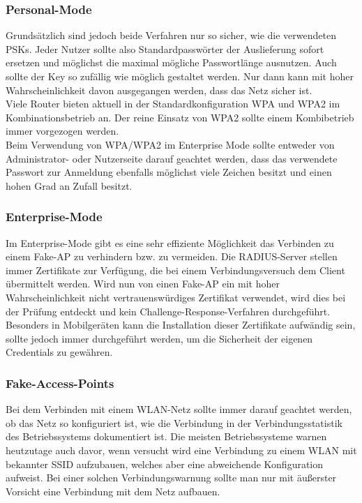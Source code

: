 \subsubsection{Personal-Mode}
Grundsätzlich sind jedoch beide Verfahren nur so sicher, wie die verwendeten PSKs. Jeder Nutzer sollte also Standardpasswörter der Auslieferung sofort ersetzen und möglichst die maximal mögliche Passwortlänge ausnutzen. Auch sollte der Key so zufällig wie möglich gestaltet werden. Nur dann kann mit hoher Wahrscheinlichkeit davon ausgegangen werden, dass das Netz sicher ist. \\
Viele Router bieten aktuell in der Standardkonfiguration WPA und WPA2 im Kombinationsbetrieb an. Der reine Einsatz von WPA2 sollte einem Kombibetrieb immer vorgezogen werden. \\
Beim Verwendung von WPA/WPA2 im Enterprise Mode sollte entweder von Administrator- oder Nutzerseite darauf geachtet werden, dass das verwendete Passwort zur Anmeldung ebenfalls möglichst viele Zeichen besitzt und einen hohen Grad an Zufall besitzt.
\subsubsection{Enterprise-Mode}
Im Enterprise-Mode gibt es eine sehr effiziente Möglichkeit das Verbinden zu einem Fake-AP zu verhindern bzw. zu vermeiden. Die RADIUS-Server stellen immer Zertifikate zur Verfügung, die bei einem Verbindungsversuch dem Client übermittelt werden. Wird nun von einen Fake-AP ein mit hoher Wahrscheinlichkeit nicht vertrauenswürdiges Zertifikat verwendet, wird dies bei der Prüfung entdeckt und kein Challenge-Response-Verfahren durchgeführt. Besonders in Mobilgeräten kann die Installation dieser Zertifikate aufwändig sein, sollte jedoch immer durchgeführt werden, um die Sicherheit der eigenen Credentials zu gewähren.
\subsubsection{Fake-Access-Points}
Bei dem Verbinden mit einem WLAN-Netz sollte immer darauf geachtet werden, ob das Netz so konfiguriert ist, wie die Verbindung in der Verbindungsstatistik des Betriebssystems dokumentiert ist. Die meisten Betriebssysteme warnen heutzutage auch davor, wenn versucht wird eine Verbindung zu einem WLAN mit bekannter SSID aufzubauen, welches aber eine abweichende Konfiguration aufweist. Bei einer solchen Verbindungswarnung sollte man nur mit äußerster Vorsicht eine Verbindung mit dem Netz aufbauen.
